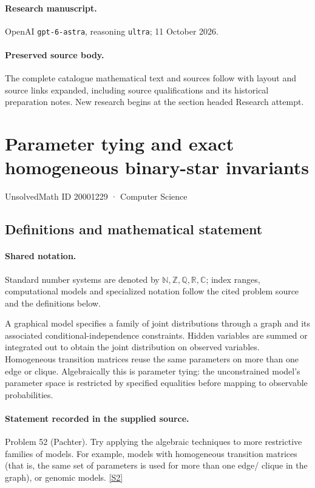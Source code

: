 \documentclass[11pt]{article}
\begin{document}
\paragraph{Research manuscript.} OpenAI \texttt{gpt-6-astra}, reasoning \texttt{ultra}; 11 October 2026.
\paragraph{Preserved source body.} The complete catalogue mathematical text and sources follow with layout and source links expanded, including source qualifications and its historical preparation notes. New research begins at the section headed Research attempt.

\section{Parameter tying and exact homogeneous binary-star invariants}\label{20001229}
{\small UnsolvedMath ID 20001229 · Computer Science}
\subsection{Definitions and mathematical statement}

\paragraph{Shared notation.}Standard number systems are denoted by $\mathbb N,\mathbb Z,\mathbb Q,\mathbb R,\mathbb C$; index ranges, computational models and specialized notation follow the cited problem source and the definitions below.


A graphical model specifies a family of joint distributions through a graph and its associated conditional-independence constraints. Hidden variables are summed or integrated out to obtain the joint distribution on observed variables. Homogeneous transition matrices reuse the same parameters on more than one edge or clique. Algebraically this is parameter tying: the unconstrained model's parameter space is restricted by specified equalities before mapping to observable probabilities.
\paragraph{Statement recorded in the supplied source.}
Problem 52 (Pachter). Try applying the algebraic techniques to more restrictive families of models. For example, models with homogeneous transition matrices (that is, the same set of parameters is used for more than one edge/ clique in the graph), or genomic models. \href{https://aimath.org/WWN/compalgstat/compalgstat.pdf}{[S2]}
\end{document}
